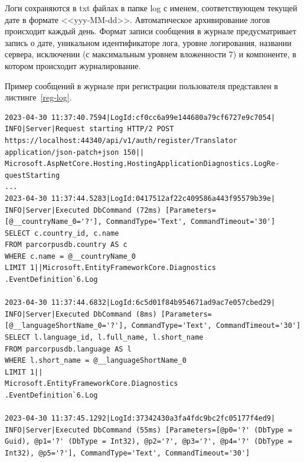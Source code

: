 Логи сохраняются в txt файлах в папке log с именем, соответствующем текущей дате в формате <<yyy-MM-dd>>. 
Автоматическое архивирование логов происходит каждый день. Формат записи сообщения в журнале предусматривает запись о дате, уникальном идентификаторе лога, уровне логирования, названии сервера, исключении (с максимальным уровнем вложенности 7) и компоненте, в котором происходит журналирование.

Пример сообщений в журнале при регистрации пользователя представлен в листинге~\ref{reg-log}.\\

\captionsetup{singlelinecheck = false, justification=raggedright}
\begin{lstlisting}[caption={Фрагмент логов при регистрации пользователя}, label=reg-log]
2023-04-30 11:37:40.7594|LogId:cf0cc6a99e144680a79cf6727e9c7054|
INFO|Server|Request starting HTTP/2 POST 
https://localhost:44340/api/v1/auth/register/Translator application/json-patch+json 150||
Microsoft.AspNetCore.Hosting.HostingApplicationDiagnostics.LogRe- questStarting
...
2023-04-30 11:37:44.5283|LogId:0417512af22c409586a443f95579b39e|
INFO|Server|Executed DbCommand (72ms) [Parameters=[@__countryName_0='?'], CommandType='Text', CommandTimeout='30']
SELECT c.country_id, c.name
FROM parcorpusdb.country AS c
WHERE c.name = @__countryName_0
LIMIT 1||Microsoft.EntityFrameworkCore.Diagnostics
.EventDefinition`6.Log

2023-04-30 11:37:44.6832|LogId:6c5d01f84b954671ad9ac7e057cbed29|
INFO|Server|Executed DbCommand (8ms) [Parameters=[@__languageShortName_0='?'], CommandType='Text', CommandTimeout='30']
SELECT l.language_id, l.full_name, l.short_name
FROM parcorpusdb.language AS l
WHERE l.short_name = @__languageShortName_0
LIMIT 1||
Microsoft.EntityFrameworkCore.Diagnostics
.EventDefinition`6.Log

2023-04-30 11:37:45.1292|LogId:37342430a3fa4fdc9bc2fc05177f4ed9|
INFO|Server|Executed DbCommand (55ms) [Parameters=[@p0='?' (DbType = Guid), @p1='?' (DbType = Int32), @p2='?', @p3='?', @p4='?' (DbType = Int32), @p5='?'], CommandType='Text', CommandTimeout='30']
\end{lstlisting}

